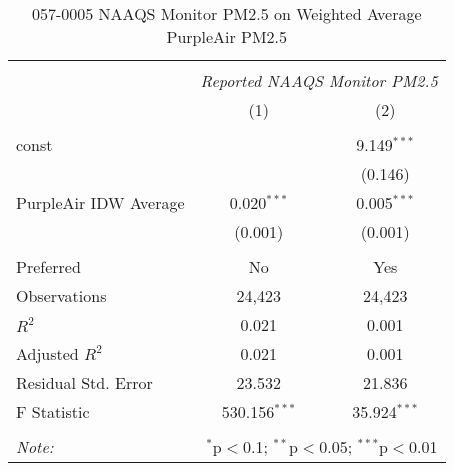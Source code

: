 \begin{table}[!htbp] \centering
  \caption{057-0005 NAAQS Monitor PM2.5 on Weighted Average PurpleAir PM2.5}
  \label{tab:reg_057-0005}
\begin{tabular}{@{\extracolsep{5pt}}lcc}
\\[-1.8ex]\hline
\hline \\[-1.8ex]
& \multicolumn{2}{c}{\textit{Reported NAAQS Monitor PM2.5}} \
\cr \cline{2-3}
\\[-1.8ex] & (1) & (2) \\
\hline \\[-1.8ex]
 const & & 9.149$^{***}$ \\
  & & (0.146) \\
 PurpleAir IDW Average & 0.020$^{***}$ & 0.005$^{***}$ \\
  & (0.001) & (0.001) \\
\hline \\[-1.8ex]
 Preferred & No & Yes \\
 Observations & 24,423 & 24,423 \\
 $R^2$ & 0.021 & 0.001 \\
 Adjusted $R^2$ & 0.021 & 0.001 \\
 Residual Std. Error & 23.532 & 21.836  \\
 F Statistic & 530.156$^{***}$  & 35.924$^{***}$  \\
\hline
\hline \\[-1.8ex]
\textit{Note:} & \multicolumn{2}{r}{$^{*}$p$<$0.1; $^{**}$p$<$0.05; $^{***}$p$<$0.01} \\
\end{tabular}
\end{table}